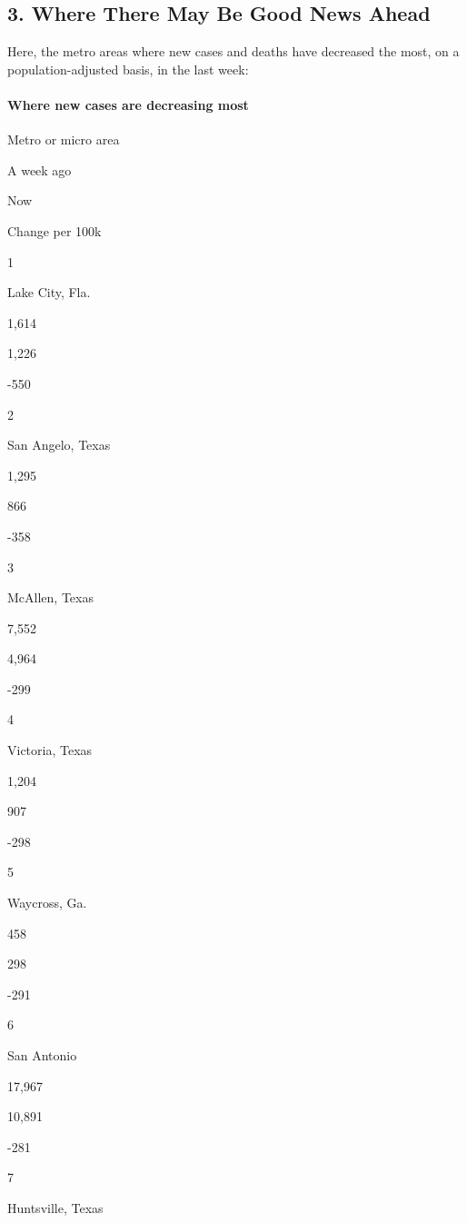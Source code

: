 \hypertarget{3-where-there-may-be-good-news-ahead}{%
\subsection{3. Where There May Be Good News
Ahead}\label{3-where-there-may-be-good-news-ahead}}

Here, the metro areas where new cases and deaths have decreased the
most, on a population-adjusted basis, in the last week:

\hypertarget{where-new-cases-are-decreasing-most}{%
\paragraph{Where new cases are decreasing
most}\label{where-new-cases-are-decreasing-most}}

Metro or micro area

A week ago

Now

Change per 100k

1

Lake City, Fla.

1,614

1,226

-550

2

San Angelo, Texas

1,295

866

-358

3

McAllen, Texas

7,552

4,964

-299

4

Victoria, Texas

1,204

907

-298

5

Waycross, Ga.

458

298

-291

6

San Antonio

17,967

10,891

-281

7

Huntsville, Texas


